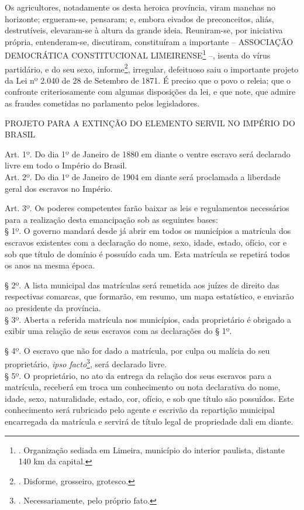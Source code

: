 Os agricultores, notadamente os desta heroica província, viram manchas
no horizonte; ergueram-se, pensaram; e, embora eivados de preconceitos,
aliás, destrutíveis, elevaram-se à altura da grande ideia. Reuniram-se,
por iniciativa própria, entenderam-se, discutiram, constituíram a
importante -- ASSOCIAÇÃO DEMOCRÁTICA CONSTITUCIONAL LIMEIRENSE\footnote{.
  Organização sediada em Limeira, município do interior paulista,
  distante 140 km da capital.} --, isenta do vírus partidário, e do seu
sexo, informe\footnote{. Disforme, grosseiro, grotesco.}, irregular,
defeituoso saiu o importante projeto da Lei nº 2.040 de 28 de Setembro
de 1871. É preciso que o povo o releia; que o confronte criteriosamente
com algumas disposições da lei, e que note, que admire as fraudes
cometidas no parlamento pelos legisladores.

PROJETO PARA A EXTINÇÃO DO ELEMENTO SERVIL NO IMPÉRIO DO BRASIL

Art. 1º. Do dia 1º de Janeiro de 1880 em diante o ventre escravo será
declarado livre em todo o Império do Brasil.\\
Art. 2º. Do dia 1º de Janeiro de 1904 em diante será proclamada a
liberdade geral dos escravos no Império.

Art. 3º. Os poderes competentes farão baixar as leis e regulamentos
necessários para a realização desta emancipação sob as seguintes
bases:\\
§ 1º. O governo mandará desde já abrir em todos os municípios a
matrícula dos escravos existentes com a declaração do nome, sexo, idade,
estado, ofício, cor e sob que título de domínio é possuído cada um. Esta
matrícula se repetirá todos os anos na mesma época.

§ 2º. A lista municipal das matrículas será remetida aos juízes de
direito das respectivas comarcas, que formarão, em resumo, um mapa
estatístico, e enviarão ao presidente da província.\\
§ 3º. Aberta a referida matrícula nos municípios, cada proprietário é
obrigado a exibir uma relação de seus escravos com as declarações do §
1º.

§ 4º. O escravo que não for dado a matrícula, por culpa ou malícia do
seu proprietário, \emph{ipso facto}\footnote{. Necessariamente, pelo
  próprio fato.}, será declarado livre.\\
§ 5º. O proprietário, no ato da entrega da relação dos seus escravos
para a matrícula, receberá em troca um conhecimento ou nota declarativa
do nome, idade, sexo, naturalidade, estado, cor, ofício, e sob que
título são possuídos. Este conhecimento será rubricado pelo agente e
escrivão da repartição municipal encarregada da matrícula e servirá de
título legal de propriedade dali em diante.

